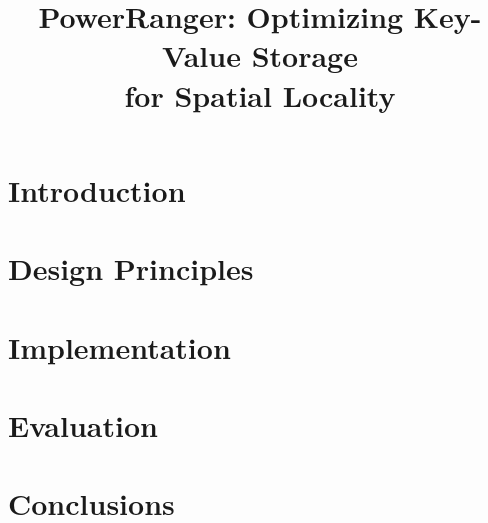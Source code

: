 \documentclass[letterpaper,twocolumn,10pt]{article}
\date{}
\newcommand{\sys}{PowerRanger}
\begin{document}
\title{\sys: Optimizing Key-Value Storage\\ for Spatial Locality} 
\author{}
\maketitle
\begin{abstract}

\end{abstract}



\section{Introduction}


\section{Design Principles}
\label{sec:principles}


%

\section{Implementation}
\label{sec:impl}


\section{Evaluation}
\label{sec:eval}


%

\section{Conclusions}
\label{sec:conclusions}






\end{document}

